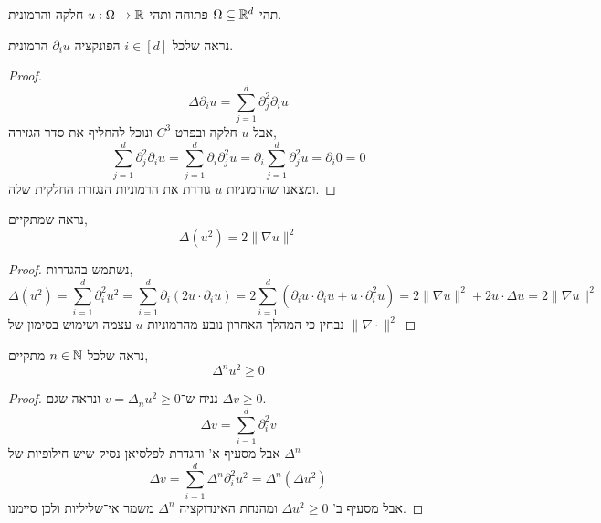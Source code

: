 \question{}
תהי $\Omega \subseteq \mathbb{R}^d$ פתוחה ותהי $u : \Omega \to \mathbb{R}$ חלקה והרמונית.

\subquestion{}
נראה שלכל $i \in [d]$ הפונקציה $\partial_i u$ הרמונית.
\begin{proof}
	\[
		\Delta \partial_i u
		= \sum_{j = 1}^d \partial_j^2 \partial_i u
	\]
	אבל $u$ חלקה ובפרט $C^3$ ונוכל להחליף את סדר הגזירה,
	\[
		\sum_{j = 1}^d \partial_j^2 \partial_i u
		= \sum_{j = 1}^d \partial_i \partial_j^2 u
		= \partial_i \sum_{j = 1}^d \partial_j^2 u
		= \partial_i 0
		= 0
	\]
	ומצאנו שהרמוניות $u$ גוררת את הרמוניות הנגזרת החלקית שלה.
\end{proof}

\subquestion{}
נראה שמתקיים,
\[
	\Delta (u^2)
	= 2 \lVert \nabla u \rVert^2
\]
\begin{proof}
	נשתמש בהגדרות,
	\[
		\Delta (u^2)
		= \sum_{i = 1}^d \partial_i^2 u^2
		= \sum_{i = 1}^d \partial_i (2 u \cdot \partial_i u)
		= 2 \sum_{i = 1}^d (\partial_i u \cdot \partial_i u + u \cdot \partial_i^2 u)
		= 2 \lVert \nabla u \rVert^2 + 2 u \cdot \Delta u
		= 2 \lVert \nabla u \rVert^2
	\]
	נבחין כי המהלך האחרון נובע מהרמוניות $u$ עצמה ושימוש בסימון של $\lVert \nabla \cdot \rVert^2$
\end{proof}

\subquestion{}
נראה שלכל $n \in \mathbb{N}$ מתקיים,
\[
	\Delta^n u^2 \ge 0
\]
\begin{proof}
	נניח ש־$v = \Delta_n u^2 \ge 0$ ונראה שגם $\Delta v \ge 0$.
	\[
		\Delta v
		= \sum_{i = 1}^d \partial_i^2 v
	\]
	אבל מסעיף א' והגדרת לפלסיאן נסיק שיש חילופיות של $\Delta^n$
	\[
		\Delta v
		= \sum_{i = 1}^d \Delta^n \partial_i^2 u^2
		= \Delta^n (\Delta u^2)
	\]
	אבל מסעיף ב' $\Delta u^2 \ge 0$ ומהנחת האינדוקציה $\Delta^n$ משמר אי־שליליות ולכן סיימנו.
\end{proof}


